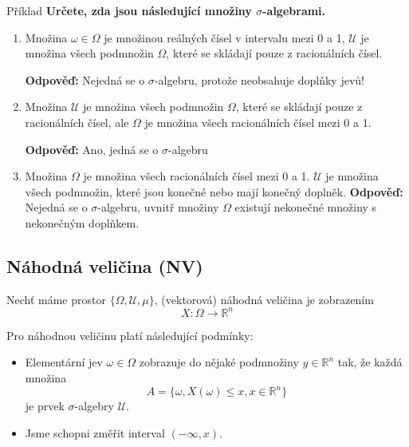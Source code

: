 \begin{note}{Příklad}
\textbf{Určete, zda jsou následující množiny $\sigma$-algebrami.}

\begin{enumerate}[label=\alph*)]
\item Množina $\omega\in\Omega$ je množinou reálných čísel v intervalu mezi 0 a 1, $\mathscr{U}$ je množina všech podmnožin $\Omega$, které se skládají pouze z racionálních čísel.\br

\textbf{Odpověď:} Nejedná se o $\sigma$-algebru, protože neobsahuje doplňky jevů!

\item Množina $\mathscr{U}$ je množina všech podmnožin $\Omega$, které se skládají pouze z racionálních čísel, ale $\Omega$ je množina všech racionálních čísel mezi 0 a 1.\br

\textbf{Odpověď:} Ano, jedná se o $\sigma$-algebru

\item Množina $\Omega$ je množina všech racionálních čísel mezi 0 a 1. $\mathscr{U}$ je množina všech podmnožin, které jsou konečné nebo mají konečný doplněk.\br
\textbf{Odpověď:} Nejedná se o $\sigma$-algebru, uvnitř množiny $\Omega$ existují nekonečné množiny s nekonečným doplňkem.
\end{enumerate}
\end{note}

\subsection{Náhodná veličina (NV)}
Nechť máme prostor $\{\Omega, \mathscr{U},\mu\}$, (vektorová) náhodná veličina je zobrazením
\[ X:\Omega\to\mathbb{R}^n \]

Pro náhodnou veličinu platí následující podmínky:
\begin{itemize}
\item Elementární jev $\omega\in\Omega$ zobrazuje do nějaké podmnožiny $y\in\mathbb{R}^n$ tak, že každá množina
\[ A=\{\omega, X(\omega)\leq x,x\in\mathbb{R}^n\} \]
je prvek $\sigma$-algebry $\mathscr{U}$.

\item Jsme schopni změřit interval $(-\infty, x)$.
\end{itemize}

